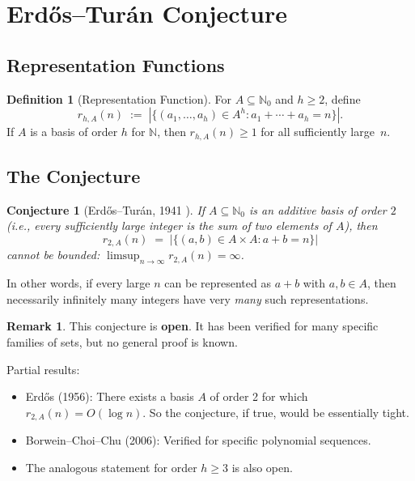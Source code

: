 \documentclass[12pt,a4paper]{amsart}
\newtheorem{conjecture}[theorem]{Conjecture}
\theoremstyle{definition}
\newtheorem{definition}[theorem]{Definition}
\newtheorem{remark}[theorem]{Remark}
\newcommand{\N}{\mathbb{N}}
\newcommand{\abs}[1]{\left|#1\right|}
\begin{document}
\section{Erd\H{o}s--Tur\'{a}n Conjecture}\label{sec:erdos-turan}

\subsection{Representation Functions}

\begin{definition}[Representation Function]
For $A \subseteq \N_0$ and $h \geq 2$, define
\[
  r_{h,A}(n) \;:=\; \abs{\{(a_1, \ldots, a_h) \in A^h :
                          a_1 + \cdots + a_h = n\}}.
\]
If $A$ is a basis of order $h$ for $\N$, then $r_{h,A}(n) \geq 1$
for all sufficiently large~$n$.
\end{definition}

\subsection{The Conjecture}

\begin{conjecture}[Erd\H{o}s--Tur\'{a}n, 1941 \cite{ErdosTuran1941}]
\label{conj:erdos-turan}
If $A \subseteq \N_0$ is an additive basis of order $2$ (i.e., every
sufficiently large integer is the sum of two elements of $A$), then
\[
  r_{2,A}(n) \;=\; \abs{\{(a, b) \in A \times A : a + b = n\}}
\]
cannot be bounded: $\limsup_{n \to \infty} r_{2,A}(n) = \infty$.
\end{conjecture}

In other words, if every large $n$ can be represented as $a + b$ with
$a, b \in A$, then necessarily infinitely many integers have very
\emph{many} such representations.

\begin{remark}
This conjecture is \textbf{open}.  It has been verified for many
specific families of sets, but no general proof is known.

Partial results:
\begin{itemize}
\item Erd\H{o}s (1956): There exists a basis $A$ of order 2 for which
      $r_{2,A}(n) = O(\log n)$.  So the conjecture, if true, would be
      essentially tight.
\item Borwein--Choi--Chu (2006): Verified for specific polynomial
      sequences.
\item The analogous statement for order $h \geq 3$ is also open.
\end{itemize}
\end{remark}
\end{document}
